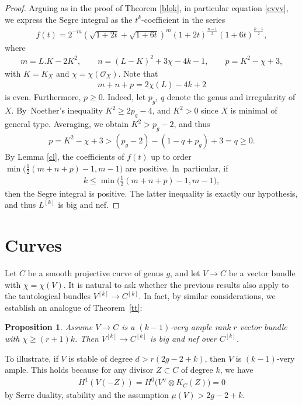 \documentclass[pdftex]{sigma}
\numberwithin{equation}{section}
\newtheorem{Proposition}[Theorem]{Proposition}
 { \theoremstyle{definition}
\newtheorem{Definition}[Theorem]{Definition}
\newtheorem{Note}[Theorem]{Note}
\newtheorem{Example}[Theorem]{Example}
\newtheorem{Remark}[Theorem]{Remark} }
\begin{document}
\begin{proof}
Arguing as in the proof of Theorem \ref{blok}, in particular equation \eqref{cvvv}, we express the Segre integral as the $t^k$-coefficient in the series
\begin{gather*}
f(t)=2^{-m} \left(\sqrt{1+2t}+\sqrt{1+6t}\right)^m {(1+2t)}^{\frac{n-1}{2}} (1+6t)^{\frac{p-1}{2}},
\end{gather*}
where
\begin{gather*}
m=L.K-2K^2, \qquad n=(L-K)^2+3\chi - 4k - 1, \qquad p=K^2-\chi+3,
\end{gather*}
with $K=K_X$ and $\chi=\chi(\mathcal O_X)$. Note that
\begin{gather*}
m+n+p=2\chi(L)-4k+2
\end{gather*}
is even. Furthermore, $p\geq 0$. Indeed, let $p_g$, $q$ denote the genus and irregularity of $X$. By~Noet\-her's inequality $K^2\geq 2p_g-4$, and $K^2>0$ since $X$ is minimal of general type. Averaging, we obtain $K^2>p_g-2$, and thus
\begin{gather*}
p=K^2-\chi+3>(p_g-2)-(1-q+p_g)+3=q\geq 0.
\end{gather*}
By Lemma \ref{cl}, the coefficients of
$f(t)$ up to order $\min\big(\frac{1}{2} (m+n+p)-1, m-1\big)$ are positive. In~particular, if
\begin{gather*}
k\leq \min\bigg(\frac{1}{2} (m+n+p)-1, m-1\bigg),
\end{gather*}
then the Segre integral is positive. The latter inequality is exactly our hypothesis, and thus $L^{[k]}$ is big and nef.
\end{proof}

\section{Curves} \label{seccur} Let $C$ be a smooth projective curve of genus $g$, and let $V\to C$ be a vector bundle with $\chi=\chi(V)$. It is natural to ask whether the previous results also apply to the tautological bundles $V^{[k]}\to C^{[k]}$. In fact, by similar considerations, we establish an analogue of Theorem~\ref{tt}:

\begin{Proposition} \label{tt3}Assume $V\to C$ is a $(k-1)$-very ample rank $r$ vector bundle with $\chi \geq (r+1)k$.
Then $V^{[k]}\to C^{[k]}$ is big and nef over $C^{[k]}$.
\end{Proposition}

To illustrate, if $V$ is stable of degree $d>r(2g-2+k)$, then $V$ is $(k-1)$-very ample. This holds because for any divisor $Z\subset C$ of degree $k$, we have
\begin{gather*}
H^1(V(-Z))=H^0\big(V^{\vee}\otimes K_C(Z)\big)=0
\end{gather*}
by Serre duality, stability and the assumption $\mu(V)>2g-2+k$.
\end{document}
